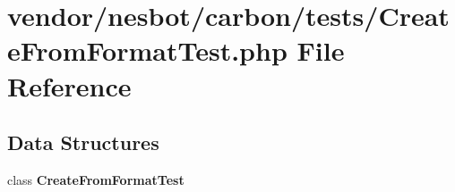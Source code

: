\section{vendor/nesbot/carbon/tests/\+Create\+From\+Format\+Test.php File Reference}
\label{_create_from_format_test_8php}
\subsection*{Data Structures}
\begin{DoxyCompactItemize}
\item 
class {\bf Create\+From\+Format\+Test}
\end{DoxyCompactItemize}

